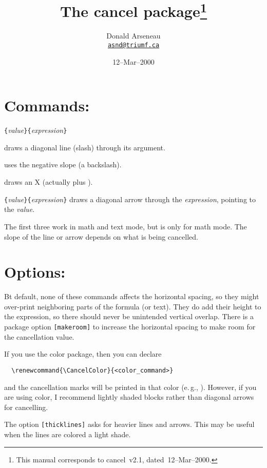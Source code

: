 \documentclass[pagesize=auto]{scrartcl}
\title{The \textsf{cancel} package\thanks{This manual corresponds to \textsf{cancel}~v2.1, dated~12--Mar--2000.}}
\author{Donald Arseneau\\\href{mailto:asnd@triumf.ca}{\texttt{asnd@triumf.ca}}}
\date{12--Mar--2000}
\newcommand*{\meta}[1]{\textlangle\textsl{#1}\textrangle}
\newcommand*{\marg}[1]{\texttt{\{}\meta{#1}\texttt{\}}}
\newcommand*{\cmd}[1]{\texttt{\string#1}}
\begin{document}
\maketitle

\section{Commands:}



\begin{labeling}{\cmd{\cancelto}\marg{value}\marg{expression}}
\item[\cmd{\cancel}] draws a diagonal line (slash) through its argument.
\item[\cmd{\bcancel}] uses the negative slope (a backslash).
\item[\cmd{\xcancel}] draws an X (actually \cmd{\cancel} plus \cmd{\bcancel}).
\item[\cmd{\cancelto}\marg{value}\marg{expression}] draws a diagonal arrow through the \meta{expression}, pointing to the \meta{value}.
\end{labeling}
%
The first three work in math and text mode, but \cmd{\cancelto} is only
for math mode.
The slope of the line or arrow depends on what is being cancelled.  


\section{Options:}

Bt default, none of these commands affects the horizontal spacing, 
so they might over-print neighboring parts of the formula (or text).
They do add their height to the expression, so there should never be 
unintended vertical overlap.  There is a package option \texttt{[makeroom]} to 
increase the horizontal spacing to make room for the cancellation value.  

If you use the color package, then you can declare
%
\begin{verbatim}
  \renewcommand{\CancelColor}{<color_command>}
\end{verbatim}
%
and the cancellation marks will be printed in that color (e.\,g., \cmd{\blue}).
However, if you are using color, I recommend lightly shaded blocks rather
than diagonal arrows for cancelling.

The option \texttt{[thicklines]} asks for heavier lines and arrows. This may be
useful when the lines are colored a light shade.
\end{document}
